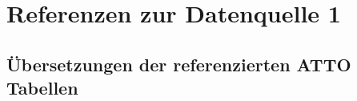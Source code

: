 
\chapter{Referenzen zur Datenquelle 1}
    
    

    





    \section{Übersetzungen der referenzierten ATTO Tabellen}
    
